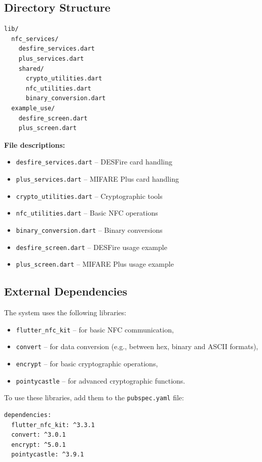 \documentclass[a4paper,12pt]{article}
\begin{document}
\newpage

\subsection{Directory Structure}
\begin{lstlisting}[language=bash]
lib/
  nfc_services/
    desfire_services.dart
    plus_services.dart
    shared/
      crypto_utilities.dart
      nfc_utilities.dart
      binary_conversion.dart
  example_use/
    desfire_screen.dart
    plus_screen.dart
\end{lstlisting}

\textbf{File descriptions:}
\begin{itemize}
    \item \texttt{desfire\_services.dart} -- DESFire card handling
    \item \texttt{plus\_services.dart} -- MIFARE Plus card handling
    \item \texttt{crypto\_utilities.dart} -- Cryptographic tools
    \item \texttt{nfc\_utilities.dart} -- Basic NFC operations
    \item \texttt{binary\_conversion.dart} -- Binary conversions
    \item \texttt{desfire\_screen.dart} -- DESFire usage example
    \item \texttt{plus\_screen.dart} -- MIFARE Plus usage example
\end{itemize}

\subsection{External Dependencies}
The system uses the following libraries:

\begin{itemize}
    \item \texttt{flutter\_nfc\_kit} – for basic NFC communication,
    \item \texttt{convert} – for data conversion (e.g., between hex, binary and ASCII formats),
    \item \texttt{encrypt} – for basic cryptographic operations,
    \item \texttt{pointycastle} – for advanced cryptographic functions.
\end{itemize}

To use these libraries, add them to the \texttt{pubspec.yaml} file:

\begin{lstlisting}[language=bash]
dependencies:
  flutter_nfc_kit: ^3.3.1
  convert: ^3.0.1
  encrypt: ^5.0.1
  pointycastle: ^3.9.1
\end{lstlisting}
\end{document}
